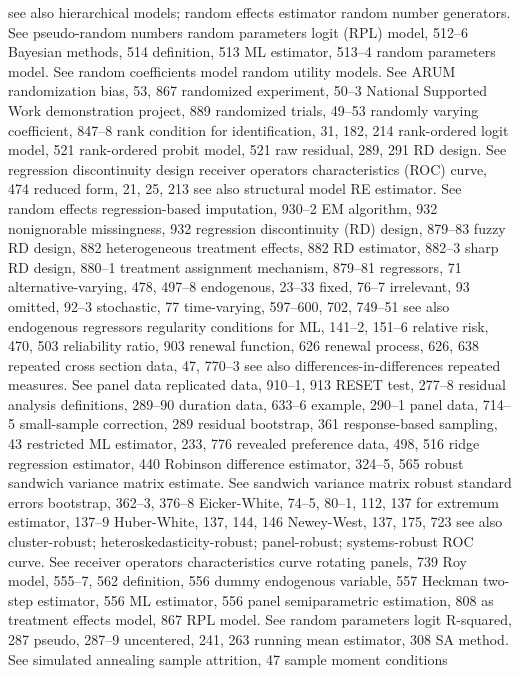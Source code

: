 see also hierarchical models; random effects
estimator
random number generators. See pseudo-random
numbers
random parameters logit (RPL) model, 512–6
Bayesian methods, 514 definition, 513
ML estimator, 513–4
random parameters model. See random coefficients model
random utility models. See ARUM randomization bias, 53, 867 randomized experiment, 50–3
National Supported Work demonstration project, 889
randomized trials, 49–53
randomly varying coefficient, 847–8
rank condition for identification, 31, 182, 214 rank-ordered logit model, 521
rank-ordered probit model, 521
raw residual, 289, 291
RD design. See regression discontinuity design receiver operators characteristics (ROC) curve, 474 reduced form, 21, 25, 213
see also structural model
RE estimator. See random effects regression-based imputation, 930–2
EM algorithm, 932
nonignorable missingness, 932
regression discontinuity (RD) design, 879–83
fuzzy RD design, 882
heterogeneous treatment effects, 882
RD estimator, 882–3
sharp RD design, 880–1
treatment assignment mechanism, 879–81
regressors, 71
alternative-varying, 478, 497–8 endogenous, 23–33
fixed, 76–7
irrelevant, 93
omitted, 92–3
stochastic, 77
time-varying, 597–600, 702, 749–51 see also endogenous regressors
regularity conditions for ML, 141–2, 151–6 relative risk, 470, 503
reliability ratio, 903
renewal function, 626
renewal process, 626, 638
repeated cross section data, 47, 770–3
see also differences-in-differences repeated measures. See panel data replicated data, 910–1, 913
RESET test, 277–8
residual analysis
definitions, 289–90
duration data, 633–6 example, 290–1
panel data, 714–5 small-sample correction, 289
residual bootstrap, 361
response-based sampling, 43
restricted ML estimator, 233, 776
revealed preference data, 498, 516
ridge regression estimator, 440
Robinson difference estimator, 324–5, 565 robust sandwich variance matrix estimate. See
sandwich variance matrix robust standard errors
bootstrap, 362–3, 376–8
Eicker-White, 74–5, 80–1, 112, 137
for extremum estimator, 137–9
Huber-White, 137, 144, 146
Newey-West, 137, 175, 723
see also cluster-robust; heteroskedasticity-robust;
panel-robust; systems-robust
ROC curve. See receiver operators characteristics
curve
rotating panels, 739
Roy model, 555–7, 562
definition, 556
dummy endogenous variable, 557 Heckman two-step estimator, 556 ML estimator, 556
panel semiparametric estimation, 808 as treatment effects model, 867
RPL model. See random parameters logit R-squared, 287
pseudo, 287–9
uncentered, 241, 263 running mean estimator, 308
SA method. See simulated annealing sample attrition, 47
sample moment conditions
